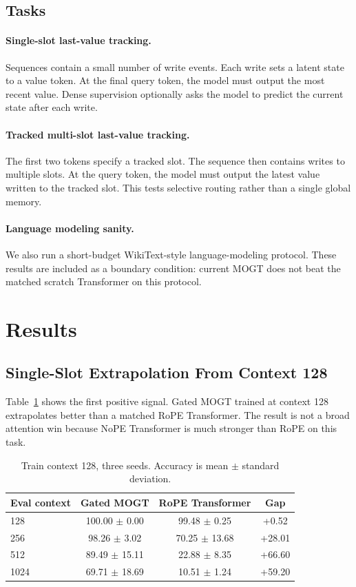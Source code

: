 \documentclass[10pt]{article}
\newcommand{\mogt}{MOGT}
\begin{document}
\subsection{Tasks}

\paragraph{Single-slot last-value tracking.}
Sequences contain a small number of write events. Each write sets a latent
state to a value token. At the final query token, the model must output the most
recent value. Dense supervision optionally asks the model to predict the current
state after each write.

\paragraph{Tracked multi-slot last-value tracking.}
The first two tokens specify a tracked slot. The sequence then contains writes
to multiple slots. At the query token, the model must output the latest value
written to the tracked slot. This tests selective routing rather than a single
global memory.

\paragraph{Language modeling sanity.}
We also run a short-budget WikiText-style language-modeling protocol. These
results are included as a boundary condition: current \mogt{} does not beat the
matched scratch Transformer on this protocol.

\section{Results}

\subsection{Single-Slot Extrapolation From Context 128}

Table~\ref{tab:ctx128} shows the first positive signal. Gated \mogt{} trained at
context 128 extrapolates better than a matched RoPE Transformer. The result is
not a broad attention win because NoPE Transformer is much stronger than RoPE on
this task.

\begin{table}[h]
\centering
\caption{Train context 128, three seeds. Accuracy is mean $\pm$ standard deviation.}
\label{tab:ctx128}
\begin{tabular}{lccc}
\toprule
Eval context & Gated \mogt{} & RoPE Transformer & Gap \\
\midrule
128  & 100.00 $\pm$ 0.00 & 99.48 $\pm$ 0.25 & +0.52 \\
256  & 98.26 $\pm$ 3.02  & 70.25 $\pm$ 13.68 & +28.01 \\
512  & 89.49 $\pm$ 15.11 & 22.88 $\pm$ 8.35 & +66.60 \\
1024 & 69.71 $\pm$ 18.69 & 10.51 $\pm$ 1.24 & +59.20 \\
\bottomrule
\end{tabular}
\end{table}
\end{document}
